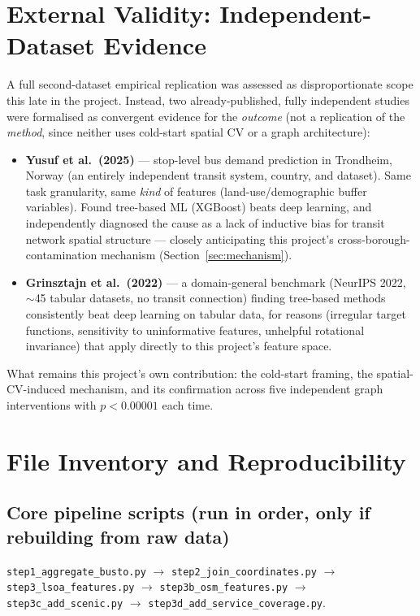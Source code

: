 \documentclass[11pt]{article}
\let\oldsection\section
\renewcommand{\section}[1]{\clearpage\oldsection{\color{sectcolor}#1}}
\let\oldsubsection\subsection
\renewcommand{\subsection}[1]{\oldsubsection{\color{sectcolor}#1}}
\begin{document}
\newpage
\section{External Validity: Independent-Dataset Evidence}
A full second-dataset empirical replication was assessed as disproportionate scope this late
in the project. Instead, two already-published, fully independent studies were formalised as
convergent evidence for the \emph{outcome} (not a replication of the \emph{method}, since
neither uses cold-start spatial CV or a graph architecture):

\begin{itemize}
\item \textbf{Yusuf et al.\ (2025)} --- stop-level bus demand prediction in Trondheim,
Norway (an entirely independent transit system, country, and dataset). Same task
granularity, same \emph{kind} of features (land-use/demographic buffer variables). Found
tree-based ML (XGBoost) beats deep learning, and independently diagnosed the cause as a lack
of inductive bias for transit network spatial structure --- closely anticipating this
project's cross-borough-contamination mechanism (Section~\ref{sec:mechanism}).
\item \textbf{Grinsztajn et al.\ (2022)} --- a domain-general benchmark (NeurIPS 2022,
$\sim$45 tabular datasets, no transit connection) finding tree-based methods consistently
beat deep learning on tabular data, for reasons (irregular target functions, sensitivity to
uninformative features, unhelpful rotational invariance) that apply directly to this
project's feature space.
\end{itemize}
What remains this project's own contribution: the cold-start framing, the spatial-CV-induced
mechanism, and its confirmation across five independent graph interventions with $p<0.00001$
each time.

\newpage
\section{File Inventory and Reproducibility}

\subsection{Core pipeline scripts (run in order, only if rebuilding from raw data)}
\texttt{step1\_aggregate\_busto.py} $\to$ \texttt{step2\_join\_coordinates.py} $\to$
\texttt{step3\_lsoa\_features.py} $\to$ \texttt{step3b\_osm\_features.py} $\to$
\texttt{step3c\_add\_scenic.py} $\to$ \texttt{step3d\_add\_service\_coverage.py}.
\end{document}
